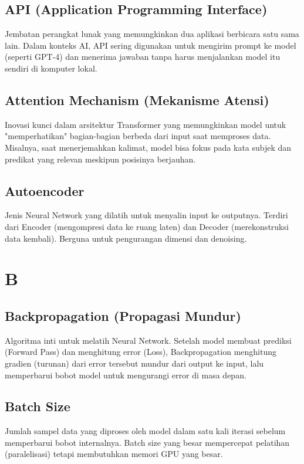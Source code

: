 \subsection*{API (Application Programming Interface)}
Jembatan perangkat lunak yang memungkinkan dua aplikasi berbicara satu sama lain. Dalam konteks AI, API sering digunakan untuk mengirim prompt ke model (seperti GPT-4) dan menerima jawaban tanpa harus menjalankan model itu sendiri di komputer lokal.

\subsection*{Attention Mechanism (Mekanisme Atensi)}
Inovasi kunci dalam arsitektur Transformer yang memungkinkan model untuk "memperhatikan" bagian-bagian berbeda dari input saat memproses data. Misalnya, saat menerjemahkan kalimat, model bisa fokus pada kata subjek dan predikat yang relevan meskipun posisinya berjauhan.

\subsection*{Autoencoder}
Jenis Neural Network yang dilatih untuk menyalin input ke outputnya. Terdiri dari Encoder (mengompresi data ke ruang laten) dan Decoder (merekonstruksi data kembali). Berguna untuk pengurangan dimensi dan denoising.

\section*{B}

\subsection*{Backpropagation (Propagasi Mundur)}
Algoritma inti untuk melatih Neural Network. Setelah model membuat prediksi (Forward Pass) dan menghitung error (Loss), Backpropagation menghitung gradien (turunan) dari error tersebut mundur dari output ke input, lalu memperbarui bobot model untuk mengurangi error di masa depan.

\subsection*{Batch Size}
Jumlah sampel data yang diproses oleh model dalam satu kali iterasi sebelum memperbarui bobot internalnya. Batch size yang besar mempercepat pelatihan (paralelisasi) tetapi membutuhkan memori GPU yang besar.

